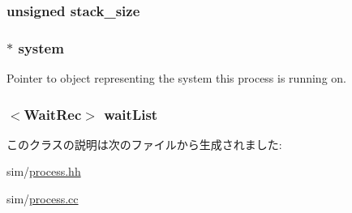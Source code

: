 \label{classProcess_a03ca56edd14eafca9beec28c150e05a6}
\hypertarget{classProcess_a846e164ff6493f2b7001b0adc9dfe535}{
\subsubsection[{stack\_\-size}]{\setlength{\rightskip}{0pt plus 5cm}unsigned {\bf stack\_\-size}}}
\label{classProcess_a846e164ff6493f2b7001b0adc9dfe535}
\hypertarget{classProcess_af27ccd765f13a4b7bd119dc7579e2746}{
\subsubsection[{system}]{$\ast$ {\bf system}}}
\label{classProcess_af27ccd765f13a4b7bd119dc7579e2746}
Pointer to object representing the system this process is running on. \hypertarget{classProcess_a8af61364ae9c966602b3b5ec1c0f7f09}{
\subsubsection[{waitList}]{$<${\bf WaitRec}$>$ {\bf waitList}}}
\label{classProcess_a8af61364ae9c966602b3b5ec1c0f7f09}


このクラスの説明は次のファイルから生成されました:\begin{DoxyCompactItemize}
\item 
sim/\hyperlink{sim_2process_8hh}{process.hh}\item 
sim/\hyperlink{sim_2process_8cc}{process.cc}\end{DoxyCompactItemize}
